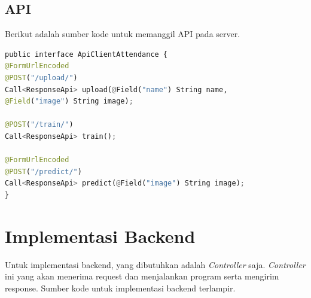 \subsection{API}
\par Berikut adalah sumber kode untuk memanggil API pada server.

\begin{lstlisting}[language=python, caption=Pemanggilan API menggunakan Retrofit2, label=code:api, firstnumber=0]
public interface ApiClientAttendance {
@FormUrlEncoded
@POST("/upload/")
Call<ResponseApi> upload(@Field("name") String name,
@Field("image") String image);

@POST("/train/")
Call<ResponseApi> train();

@FormUrlEncoded
@POST("/predict/")
Call<ResponseApi> predict(@Field("image") String image);
}
\end{lstlisting}

\section{Implementasi Backend}
Untuk implementasi backend, yang dibutuhkan adalah \textit{Controller} saja. \textit{Controller} ini yang akan menerima request dan menjalankan program serta mengirim response.
Sumber kode untuk implementasi backend terlampir.